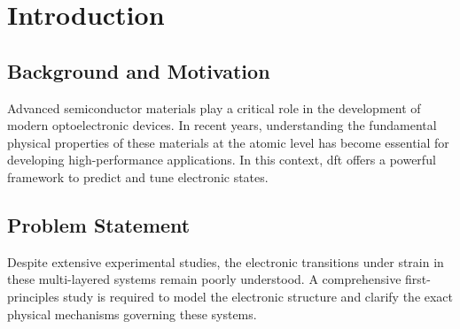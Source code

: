 %
%
%

\chapter{Introduction}
\label{ch:intro}

\section{Background and Motivation}
Advanced semiconductor materials play a critical role in the development of modern optoelectronic devices. In recent years, understanding the fundamental physical properties of these materials at the atomic level has become essential for developing high-performance applications. In this context, \gls{dft} offers a powerful framework to predict and tune electronic states.

\section{Problem Statement}
Despite extensive experimental studies, the electronic transitions under strain in these multi-layered systems remain poorly understood. A comprehensive first-principles study is required to model the electronic structure and clarify the exact physical mechanisms governing these systems.

